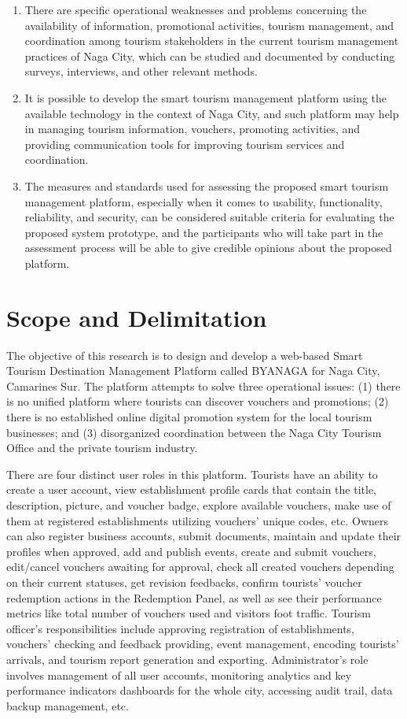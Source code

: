 \documentclass{research}
\begin{document}
\begin{enumerate}
    \item There are specific operational weaknesses and problems concerning the availability of information, promotional activities, tourism management, and coordination among tourism stakeholders in the current tourism management practices of Naga City, which can be studied and documented by conducting surveys, interviews, and other relevant methods.
    \item It is possible to develop the smart tourism management platform using the available technology in the context of Naga City, and such platform may help in managing tourism information, vouchers, promoting activities, and providing communication tools for improving tourism services and coordination.
    \item The measures and standards used for assessing the proposed smart tourism management platform, especially when it comes to usability, functionality, reliability, and security, can be considered suitable criteria for evaluating the proposed system prototype, and the participants who will take part in the assessment process will be able to give credible opinions about the proposed platform.
\end{enumerate}

\section{Scope and Delimitation}

The objective of this research is to design and develop a web-based Smart Tourism Destination Management Platform called BYANAGA for Naga City, Camarines Sur. The platform attempts to solve three operational issues: (1) there is no unified platform where tourists can discover vouchers and promotions; (2) there is no established online digital promotion system for the local tourism businesses; and (3) disorganized coordination between the Naga City Tourism Office and the private tourism industry.

There are four distinct user roles in this platform. Tourists have an ability to create a user account, view establishment profile cards that contain the title, description, picture, and voucher badge, explore available vouchers, make use of them at registered establishments utilizing vouchers' unique codes, etc. Owners can also register business accounts, submit documents, maintain and update their profiles when approved, add and publish events, create and submit vouchers, edit/cancel vouchers awaiting for approval, check all created vouchers depending on their current statuses, get revision feedbacks, confirm tourists' voucher redemption actions in the Redemption Panel, as well as see their performance metrics like total number of vouchers used and visitors foot traffic. Tourism officer's responsibilities include approving registration of establishments, vouchers' checking and feedback providing, event management, encoding tourists' arrivals, and tourism report generation and exporting. Administrator's role involves management of all user accounts, monitoring analytics and key performance indicators dashboards for the whole city, accessing audit trail, data backup management, etc.
\end{document}
